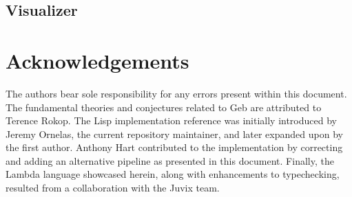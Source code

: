 \subsection{Visualizer}

\section*{Acknowledgements}
The authors bear sole responsibility for any errors present within this
document. The fundamental theories and conjectures related to Geb are
attributed to Terence Rokop. The Lisp implementation reference was
initially introduced by Jeremy Ornelas, the current repository maintainer,
and later expanded upon by the first author. Anthony Hart contributed to
the implementation by correcting and adding an alternative pipeline as
presented in this document. Finally, the Lambda language showcased herein,
along with enhancements to typechecking, resulted from a collaboration with
the Juvix team.
\nocite{*}



